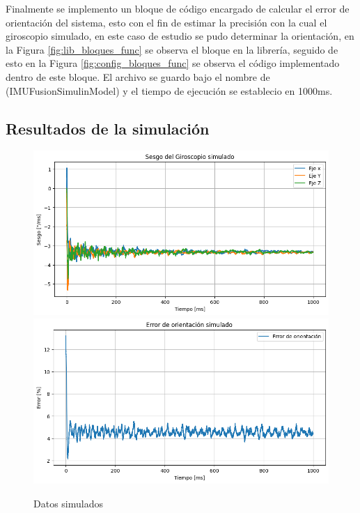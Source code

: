 Finalmente se implemento un bloque de código encargado de calcular el error de orientación del sistema, esto con el fin de estimar la precisión con la cual el giroscopio simulado, en este caso de estudio se pudo determinar la orientación, en la Figura \ref{fig:lib_bloques_func} se observa el bloque en la librería, seguido de esto en la Figura \ref{fig:config_bloques_func} se observa el código implementado dentro de este bloque. El archivo se guardo bajo el nombre de (IMUFusionSimulinModel) y el tiempo de ejecución se establecio en 1000ms. 
\newpage

\subsection{Resultados de la simulación}\label{subsub:resultados_simulados_IMU}

\begin{figure}[htbp]
    \centering
    \includegraphics[scale=0.3]{fig/Capitulo5/Caso_de_estudio_IMU/data/simulated/sesgo_simulado.png}
    \vspace{1cm}
    \includegraphics[scale=0.3]{fig/Capitulo5/Caso_de_estudio_IMU/data/simulated/error_de_orientacion_simulado.png}
    \caption{Datos simulados}
    \label{fig:data_simulated}
\end{figure}

